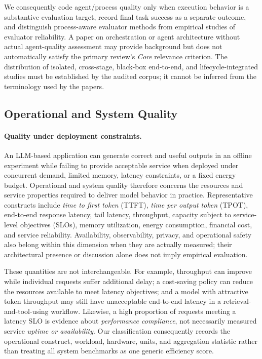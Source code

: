 We consequently code agent/process quality only when execution behavior is a substantive evaluation target, record final task success as a separate outcome, and distinguish process-aware evaluator methods from empirical studies of evaluator reliability. A paper on orchestration or agent architecture without actual agent-quality assessment may provide background but does not automatically satisfy the primary review's \emph{Core} relevance criterion. The distribution of isolated, cross-stage, black-box end-to-end, and lifecycle-integrated studies must be established by the audited corpus; it cannot be inferred from the terminology used by the papers.

\subsection{Operational and System Quality}
\label{sec:operational-quality}

\paragraph{Quality under deployment constraints.}
An LLM-based application can generate correct and useful outputs in an offline experiment while failing to provide acceptable service when deployed under concurrent demand, limited memory, latency constraints, or a fixed energy budget. Operational and system quality therefore concerns the resources and service properties required to deliver model behavior in practice. Representative constructs include \emph{time to first token} (TTFT), \emph{time per output token} (TPOT), end-to-end response latency, tail latency, throughput, capacity subject to service-level objectives (SLOs), memory utilization, energy consumption, financial cost, and service reliability. Availability, observability, privacy, and operational safety also belong within this dimension when they are actually measured; their architectural presence or discussion alone does not imply empirical evaluation.

These quantities are not interchangeable. For example, throughput can improve while individual requests suffer additional delay; a cost-saving policy can reduce the resources available to meet latency objectives; and a model with attractive token throughput may still have unacceptable end-to-end latency in a retrieval-and-tool-using workflow. Likewise, a high proportion of requests meeting a latency SLO is evidence about \emph{performance compliance}, not necessarily measured service \emph{uptime or availability}. Our classification consequently records the operational construct, workload, hardware, units, and aggregation statistic rather than treating all system benchmarks as one generic efficiency score.

